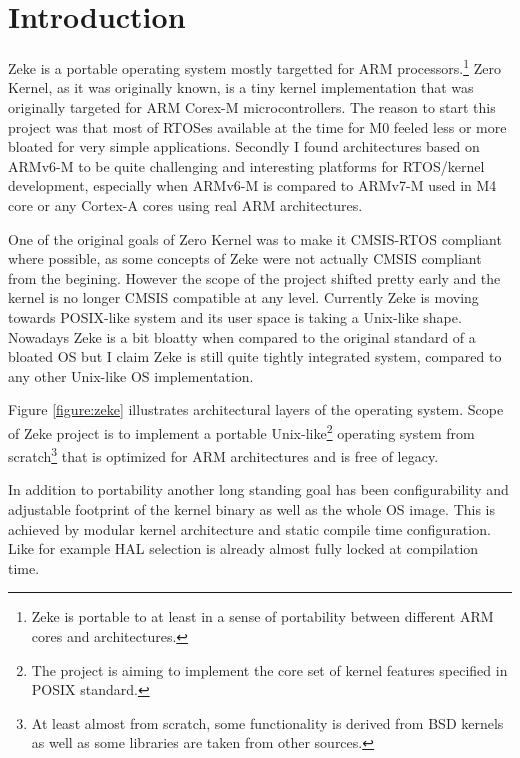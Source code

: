 \part{Introduction}

Zeke is a portable operating system mostly targetted for ARM
processors.\footnote{Zeke is portable to at least in a sense of portability
    between different ARM cores and architectures.}
Zero Kernel, as it was originally known, is a tiny kernel implementation that
was originally targeted for ARM Corex-M microcontrollers. The reason to start
this project was that most of RTOSes available at the time for M0 feeled less
or more bloated for very simple applications. Secondly I found architectures
based on ARMv6-M to be quite challenging and interesting platforms for
RTOS/kernel development, especially when ARMv6-M is compared to ARMv7-M used
in M4 core or any Cortex-A cores using real ARM architectures.

One of the original goals of Zero Kernel was to make it CMSIS-RTOS compliant
where possible, as some concepts of Zeke were not actually CMSIS compliant
from the begining. However the scope of the project shifted pretty early and
the kernel is no longer CMSIS compatible at any level. Currently Zeke is
moving towards POSIX-like system and its user space is taking a Unix-like
shape. Nowadays Zeke is a bit bloatty when compared to the original standard
of a bloated OS but I claim Zeke is still quite tightly integrated system,
compared to any other Unix-like OS implementation.

Figure \ref{figure:zeke} illustrates architectural layers of the operating
system. Scope of Zeke project is to implement a portable
Unix-like\footnote{The project is aiming to implement the core set of kernel
    features specified in \ac{POSIX} standard.} operating system from
scratch\footnote{At least almost from scratch, some functionality is derived
from BSD kernels as well as some libraries are taken from other sources.} that
is optimized for ARM architectures and is free of legacy.

In addition to portability another long standing goal has been configurability
and adjustable footprint of the kernel binary as well as the whole OS image.
This is achieved by modular kernel architecture and static compile time
configuration. Like for example \ac{HAL} selection is already almost fully
locked at compilation time.

